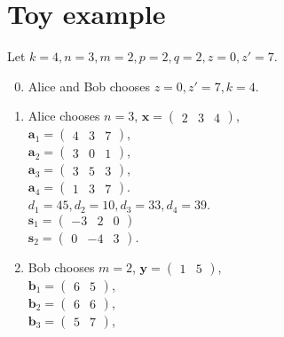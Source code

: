 \section{Toy example}
Let $ k = 4, n = 3, m = 2, p = 2, q = 2, z = 0, z' = 7 $. \\
\begin{enumerate}
	\setcounter{enumi}{-1}
	\item Alice and Bob chooses $ z = 0, z' = 7, k = 4 $.
	\item Alice chooses $ n = 3 $, $ \textbf{x} = \begin{pmatrix} 2 & 3 & 4 \end{pmatrix}	 $,\\
	 $ \textbf{a}_1 = \begin{pmatrix} 4 & 3 & 7 \end{pmatrix} $, \\
	 $ \textbf{a}_2 = \begin{pmatrix} 3 & 0 & 1 \end{pmatrix} $, \\ 
	 $ \textbf{a}_3 = \begin{pmatrix} 3 & 5 & 3 \end{pmatrix} $, \\
	 $ \textbf{a}_4 = \begin{pmatrix} 1 & 3 & 7 \end{pmatrix} $. \\
	 $ d_1 = 45, d_2 = 10, d_3 = 33, d_4 = 39 $. \\
	 $ \textbf{s}_1 = \begin{pmatrix} -3 & 2 & 0 \end{pmatrix}$\\
	 $ \textbf{s}_2 = \begin{pmatrix} 0 & -4 & 3 \end{pmatrix} $. 
	\item Bob chooses $ m = 2 $, $ \textbf{y} = \begin{pmatrix} 1 & 5 \end{pmatrix} $,\\
	$ \textbf{b}_1 = \begin{pmatrix} 6 & 5 \end{pmatrix}$,\\
	$\textbf{b}_2 = \begin{pmatrix} 6 & 6 \end{pmatrix}$,\\ 
	$\textbf{b}_3 = \begin{pmatrix} 5 & 7 \end{pmatrix}$,\\

\end{enumerate}
